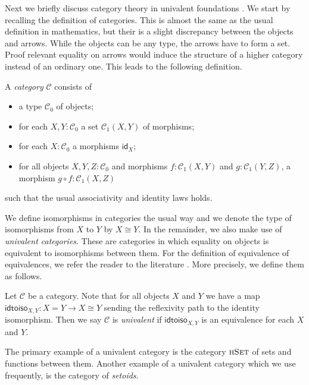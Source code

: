 \documentclass[9pt]{entcs}
\newcommand{\type}[1]{\textsc{#1}}
\newcommand{\function}[1]{\mathsf{#1}}
\newcommand{\morphism}[1]{\mathsf{#1}}
\newcommand{\hset}{\type{hSet}} %
\newcommand{\0}{\textbf{0}} %
\newcommand{\1}{\textbf{1}} %
\newcommand{\idm}[1]{\morphism{id}_{#1}} %
\newcommand{\compm}[2]{#2 \circ #1} %
\newcommand{\iso}[2]{#1 \cong #2} %
\newcommand{\idtoiso}{\function{idtoiso}} %
\begin{document}
Next we briefly discuss category theory in univalent foundations \cite{AhrensKS15,hottbook}.
We start by recalling the definition of categories.
This is almost the same as the usual definition in mathematics, but their is a slight discrepancy between the objects and arrows.
While the objects can be any type, the arrows have to form a set.
Proof relevant equality on arrows would induce the structure of a higher category instead of an ordinary one.
This leads to the following definition.

\begin{definition}
\label{def:cat}
A \emph{category} $\mathcal{C}$ consists of
\begin{itemize}
	\item a type $\mathcal{C}_0$ of objects;
	\item for each $X, Y : \mathcal{C}_0$ a set $\mathcal{C}_1(X,Y)$ of morphisms;
	\item for each $X : \mathcal{C}_0$ a morphisms $\idm{X}$;
	\item for all objects $X, Y, Z : \mathcal{C}_0$ and morphisms $f : \mathcal{C}_1(X,Y)$ and $g : \mathcal{C}_1(Y,Z)$, a morphism $\compm{f}{g} : \mathcal{C}_1(X,Z)$
\end{itemize}
such that the usual associativity and identity laws holds.
\end{definition}

We define isomorphisms in categories the usual way and we denote the type of isomorphisms from $X$ to $Y$ by $\iso{X}{Y}$.
In the remainder, we also make use of \emph{univalent categories}.
These are categories in which equality on objects is equivalent to isomorphisms between them.
For the definition of equivalence of equivalences, we refer the reader to the literature \cite{hottbook}.
More precisely, we define them as follows.

\begin{definition}
\label{def:univalent}
Let $\mathcal{C}$ be a category.
Note that for all objects $X$ and $Y$ we have a map $\idtoiso_{X,Y} : X = Y \rightarrow \iso{X}{Y}$ sending the reflexivity path to the identity isomorphism.
Then we say $\mathcal{C}$ is \emph{univalent} if $\idtoiso_{X,Y}$ is an equivalence for each $X$ and $Y$.
\end{definition}

The primary example of a univalent category is the category $\hset$ of sets and functions between them.
Another example of a univalent category which we use frequently, is the category of \emph{setoids}.
\end{document}
